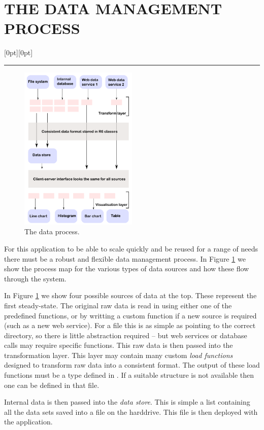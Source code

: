 \documentclass[12pt]{article}
\newcommand\statssection[1]{%
  \section*{\MakeUppercase{#1}}
  \raisebox{1.5em}[0pt][0pt]{\textcolor{statsorange}{\rule{0.2\textwidth}{6pt}}}
}
\begin{document}
\clearpage
\statssection{The data management process}\label{sec:data}
\begin{figure}
\centering
\includegraphics[width=0.5\textwidth]{figures/data_process.pdf}
 	\caption{The data process.}\label{fig:data_process}
\end{figure}
For this application to be able to scale quickly and be reused for a range of needs there must be a robust and flexible data management process.  In Figure \ref{fig:data_process} we show the process map for the various types of data sources and how these flow through the system.

In Figure \ref{fig:data_process} we show four possible sources of data at the top.  These represent the first steady-state.  The original raw data is read in using either one of the predefined functions, or by writting a custom function if a new source is required (such as a new web service).  For a file this is as simple as pointing to the correct directory, so there is little abstraction required -- but web services or database calls may require specific functions.  This raw data is then passed into the transformation layer.  This layer may contain many custom \textit{load functions} designed to transform raw data into a consistent format.  The output of these load functions must be a type defined in .  If a suitable structure is not available then one can be defined in that file.

Internal data is then passed into the \textit{data store}.  This is simple a list containing all the data sets saved into a file on the harddrive.  This file is then deployed with the application.
\end{document}
